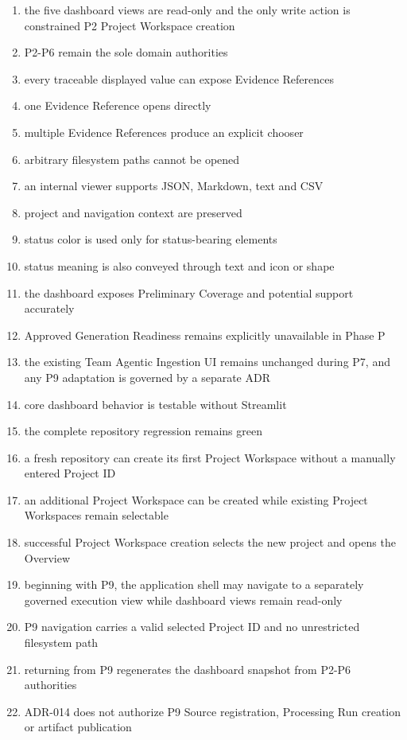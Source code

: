 \begin{enumerate}
\def\labelenumi{\arabic{enumi}.}
\tightlist
\item
  the five dashboard views are read-only and the only write action is constrained P2 Project Workspace creation
\item
  P2-P6 remain the sole domain authorities
\item
  every traceable displayed value can expose Evidence References
\item
  one Evidence Reference opens directly
\item
  multiple Evidence References produce an explicit chooser
\item
  arbitrary filesystem paths cannot be opened
\item
  an internal viewer supports JSON, Markdown, text and CSV
\item
  project and navigation context are preserved
\item
  status color is used only for status-bearing elements
\item
  status meaning is also conveyed through text and icon or shape
\item
  the dashboard exposes Preliminary Coverage and potential support accurately
\item
  Approved Generation Readiness remains explicitly unavailable in Phase P
\item
  the existing Team Agentic Ingestion UI remains unchanged during P7, and any P9 adaptation is governed by a separate ADR
\item
  core dashboard behavior is testable without Streamlit
\item
  the complete repository regression remains green
\item
  a fresh repository can create its first Project Workspace without a manually entered Project ID
\item
  an additional Project Workspace can be created while existing Project Workspaces remain selectable
\item
  successful Project Workspace creation selects the new project and opens the Overview
\item
  beginning with P9, the application shell may navigate to a separately governed execution view while dashboard views remain read-only
\item
  P9 navigation carries a valid selected Project ID and no unrestricted filesystem path
\item
  returning from P9 regenerates the dashboard snapshot from P2-P6 authorities
\item
  ADR-014 does not authorize P9 Source registration, Processing Run creation or artifact publication
\end{enumerate}

